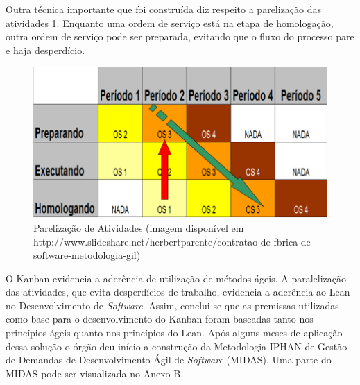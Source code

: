 Outra técnica importante que foi construída diz respeito a parelização das atividades \ref{kanban5}. Enquanto uma ordem de serviço está na etapa de homologação, outra ordem de serviço pode ser preparada, evitando que o fluxo do processo pare e haja desperdício. 

\begin{figure}[H]
		\centering
		
			\includegraphics[scale=0.5]{figuras/kanbanIPHAN5.png}
		\caption{Parelização de Atividades (imagem disponível em http://www.slideshare.net/herbertparente/contratao-de-fbrica-de-software-metodologia-gil)}
		\label{kanban5}
\end{figure}

O Kanban evidencia a aderência de utilização de métodos ágeis. A paralelização das atividades, que evita desperdícios de trabalho, evidencia a aderência ao Lean no Desenvolvimento de \textit{Software}. Assim, conclui-se que as premissas utilizadas como base para o desenvolvimento do Kanban foram baseadas tanto nos princípios ágeis quanto nos princípios do Lean. Após alguns meses de aplicação dessa solução o órgão deu início a construção da Metodologia IPHAN de Gestão de Demandas de Desenvolvimento Ágil de \textit{Software} (MIDAS). Uma parte do MIDAS pode ser visualizada no Anexo B.

\textcolor{red}{}

